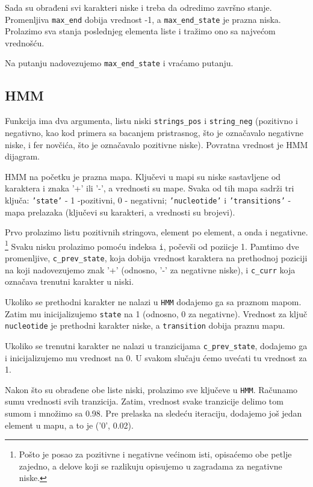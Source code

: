 Sada su obrađeni svi karakteri niske i treba da odredimo završno stanje. Promenljiva \texttt{max\_end} dobija vrednost -1, a \texttt{max\_end\_state} je prazna niska. Prolazimo sva stanja poslednjeg elementa liste i tražimo ono sa najvećom vrednošću.

Na putanju nadovezujemo \texttt{max\_end\_state} i vraćamo putanju.

\subsection{HMM}

Funkcija ima dva argumenta, listu niski \texttt{strings\_pos} i \texttt{string\_neg} (pozitivno i negativno, kao kod primera sa bacanjem pristrasnog, što je označavalo negativne niske, i fer novčića, što je označavalo pozitivne niske). Povratna vrednost je HMM dijagram.

HMM na početku je prazna mapa. Ključevi u mapi su niske sastavljene od karaktera i znaka '+' ili '-', a vrednosti su mape. Svaka od tih mapa sadrži tri ključa: \texttt{'state'} - 1 -pozitivni, 0 - negativni; \texttt{'nucleotide'} i \texttt{'transitions'} - mapa prelazaka (ključevi su karakteri, a vrednosti su brojevi).

Prvo prolazimo listu pozitivnih stringova, element po element, a onda i negativne. \footnote{Pošto je posao za pozitivne i negativne većinom isti, opisaćemo obe petlje zajedno, a delove koji se razlikuju opisujemo u zagradama za negativne niske.} Svaku nisku prolazimo pomoću indeksa \texttt{i}, počevši od poziicje 1. Pamtimo dve promenljive, \texttt{c\_prev\_state}, koja dobija vrednost karaktera na prethodnoj poziciji na koji nadovezujemo znak '+' (odnosno, '-' za negativne niske), i \texttt{c\_curr} koja označava trenutni karakter u niski.

Ukoliko se prethodni karakter ne nalazi u \texttt{HMM} dodajemo ga sa praznom mapom. Zatim mu inicijalizujemo \texttt{state} na 1 (odnosno, 0 za negativne). Vrednost za ključ \texttt{nucleotide} je prethodni karakter niske, a \texttt{transition} dobija praznu mapu.

Ukoliko se trenutni karakter ne nalazi u tranzicijama \texttt{c\_prev\_state}, dodajemo ga i inicijalizujemo mu vrednost na 0. U svakom slučaju ćemo uvećati tu vrednost za 1.

Nakon što su obrađene obe liste niski, prolazimo sve ključeve u \texttt{HMM}. Računamo sumu vrednosti svih tranzicija. Zatim, vrednost svake tranzicije delimo tom sumom i množimo sa 0.98. Pre prelaska na sledeću iteraciju, dodajemo još jedan element u mapu, a to je ('0', 0.02).


